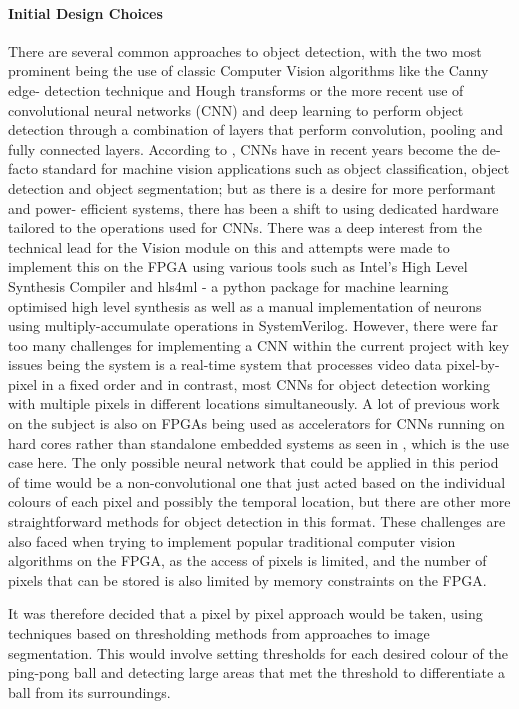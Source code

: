 \documentclass[a4paper]{article}
\begin{document}
\paragraph*{Initial Design Choices}

There are several common approaches to object detection, with the two most 
prominent being the use of classic Computer Vision algorithms like the Canny edge-
detection technique and Hough transforms or the more recent use of convolutional
neural networks (CNN) and deep learning to perform object detection through a 
combination of layers that perform convolution, pooling and fully connected layers. 
According to \cite{DBLP:journals/corr/abs-1806-01683}, CNNs have in recent years 
become the de-facto standard for machine vision applications such as object 
classification, object detection and object segmentation; but as there is a desire 
for more performant and power- efficient systems, there has been a shift to 
using dedicated hardware tailored to the operations used for CNNs. There was a 
deep interest from the technical lead for the Vision module on this and attempts
were made to implement this on the FPGA using various tools such as Intel's High 
Level Synthesis Compiler \cite{IntelHLS} and hls4ml - a python package for machine learning 
optimised high level synthesis \cite{HLS4ML} as well as a manual implementation of neurons using
multiply-accumulate operations in SystemVerilog. 
However, there were far too many challenges for implementing a CNN within the 
current project with key issues being the system is a real-time system that 
processes video data pixel-by-pixel in a fixed order and in contrast, most CNNs for object 
detection working with multiple pixels in different locations simultaneously. 
A lot of previous work on the subject is also on FPGAs being used as accelerators for 
CNNs running on hard cores rather than standalone embedded systems as seen in \cite{DBLP:journals/corr/abs-1806-01683}
, which is the use case here. The only possible neural network that could be applied in this period of time
would be a non-convolutional one that just acted based on the individual colours of each pixel
and possibly the temporal location, but there are other more straightforward methods for object
detection in this format. 
These challenges are also faced when trying to implement popular traditional computer vision 
algorithms on the FPGA, as the access of pixels is limited, and the number of pixels that can be
stored is also limited by memory constraints on the FPGA. 

It was therefore decided that a pixel by pixel approach would be taken, using techniques
based on thresholding methods from approaches to image segmentation. This would
involve setting thresholds for each desired colour of the ping-pong ball and detecting large 
areas that met the threshold to differentiate a ball from its surroundings. 
\end{document}
